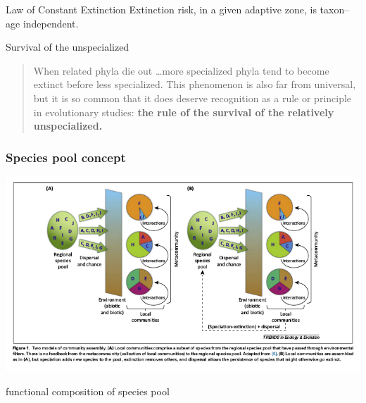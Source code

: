 \documentclass{beamer}
\begin{document}
\begin{frame}
  \begin{alertblock}{Law of Constant Extinction}
    Extinction risk, in a given adaptive zone, is taxon--age independent.
  \end{alertblock}

  \small{}
\end{frame}

\begin{frame}
  \begin{block}{Survival of the unspecialized}
    \begin{quote}
      When related phyla die out \dots more specialized phyla tend to become extinct before less specialized. This phenomenon is also far from universal, but it is so common that it does deserve recognition as a rule or principle in evolutionary studies: \textbf{the rule of the survival of the relatively unspecialized.}
    \end{quote}
  \end{block}

  \small{}
\end{frame}


\begin{frame}
  \frametitle{Species pool concept}

  \begin{center}
    \includegraphics[height=0.8\textheight,width=\textwidth,keepaspectratio=true]{figure/schemske_pool}
  \end{center}

\end{frame}

\begin{frame}
  functional composition of species pool
\end{frame}
\end{document}

